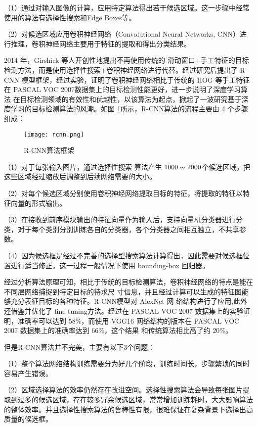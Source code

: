 （1）通过对输入图像的计算，应用特定算法得出若干候选区域。这一步骤中经常使用的算法有选择性搜索和Edge Boxes等。

（2）对候选区域应用卷积神经网络（Convolutional Neural Networks, CNN）进行推理，卷积神经网络主要用于特征的提取和得出分类结果。

2014 年，Girshick 等人开创性地提出不再使用传统的
滑动窗口+手工特征的目标检测方法，而是使用选择性搜索+卷积神经网络进行代替。经过研究后提出了 R-CNN 模型框架\cite{girshick2014rich}，经过实验，证明了卷积神经网络相比于传统的 HOG
等手工特征在 PASCAL VOC 2007数据集上的目标检测性能更好，进一步说明了深度学习算法
在目标检测领域的有效性和优越性，以该算法为起点，掀起了一波研究基于深度学习的目标检测算法的风潮。如图
\ref{rcnn}所示，R-CNN算法的流程主要由 4 个步骤组成：

\begin{figure}[htbp]
    \centering
    \texttt{[image: rcnn.png]}
    \caption{R-CNN算法框架}
    \label{rcnn}
\end{figure}

（1）对于每张输入图片，通过选择性搜索
算法产生 $1000\thicksim2000$个候选区域，把这些区域经过缩放后调整到后续网络需要的大小。

（2）对每个候选区域分别使用卷积神经网络提取目标的特征，将提取的特征以特征向量的形式输出。

（3）在接收到前序模块输出的特征向量作为输入后，支持向量机分类器进行分类，对于每个类别分别训练各自的分类器，各个分类器之间相互独立，不共享参数。

（4）因为候选框是经过不完善的选择型搜索算法计算得出，因此需要对候选框位置进行适当修正，这一过程一般情况下使用 bounding-box 回归器。

经过分析算法原理可知，相比于传统的目标检测算法，卷积神经网络的特点是能在不同层网络捕捉到特定目标的待求尺
寸信息，并且经过计算可以生成的特征图能够充分表征目标的各种特征。R-CNN模型对 AlexNet 网
络结构进行了应用,此外还借鉴并优化了 fine-tuning方法。经过在 PASCAL VOC 2007 数据集上的实验证明，准确率可以达到 $58\%$，而使用 VGG16 网络结构的版本在 PASCAL VOC 2007 数据集上的准确率达到 $66\%$，这个结果
和传统算法相比高了约 $20\%$。

但是R-CNN算法并不完美，主要有以下3个问题：

（1）整个算法网络结构训练需要分为好几个阶段，训练时间长，步骤繁琐的同时容易产生错误。

（2）区域选择算法的效率仍然存在改进空间。选择性搜索算法会导致每张图片提取到过多的候选区域，存在较多冗余候选区域，常常增加训练耗时，大大影响算法的整体效率。并且选择性搜索算法的鲁棒性有限，很难保证在复杂背景下选择出高质量的候选框。

